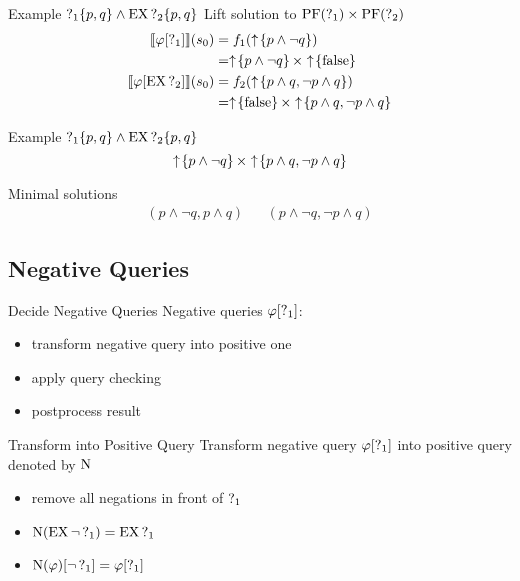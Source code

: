 
\begin{frame}{Example $\operatorname{?}_1\{p,q\} \land \operatorname{EX}\operatorname{?}_2\{p,q\}$}
  Lift solution to $\operatorname{PF}(\operatorname{?}_1) \times \operatorname{PF}(\operatorname{?}_2)$
  \begin{align*}
    \llbracket \varphi[\operatorname{?}_1] \rrbracket (s_0) 
      &= f_1(\uparrow \! \left\{ p \land \lnot q \right\}) \\
      &= \uparrow \! \left\{ p \land \lnot q \right\} \times \uparrow \! \left\{ \operatorname{false} \right\} \\
    \llbracket \varphi[\operatorname{EX}\operatorname{?}_2] \rrbracket (s_0) 
      &= f_2(\uparrow \! \left\{ p \land q, \lnot p \land q \right\}) \\
      &= \uparrow \! \left\{ \operatorname{false} \right\} \times \uparrow \! \left\{ p \land q, \lnot p \land q \right\}
  \end{align*}
\end{frame}

\begin{frame}{Example $\operatorname{?}_1\{p,q\} \land \operatorname{EX}\operatorname{?}_2\{p,q\}$}
  \[
    \uparrow \! \left\{ p \land \lnot q \right\} \times \uparrow \! \left\{ p \land q, \lnot p \land q \right\}
  \]

  Minimal solutions
  \begin{align*}
    (p \land \lnot q, p \land q) && (p \land \lnot q,\lnot p \land q)
  \end{align*}
\end{frame}



\subsection{Negative Queries}%

\begin{frame}{Decide Negative Queries}
  Negative queries $\varphi[\operatorname{?}_1]$:
  \begin{itemize}
    \item transform negative query into positive one
    \item apply query checking
    \item postprocess result
  \end{itemize}
\end{frame}

\begin{frame}{Transform into Positive Query}
  Transform negative query $\varphi[\operatorname{?}_1]$ into positive query denoted by $\operatorname{N}$
  \begin{itemize}
    \item remove all negations in front of $\operatorname{?}_{1}$
    \item $\operatorname{N}(\operatorname{EX} \lnot \operatorname{?}_1) = \operatorname{EX} \operatorname{?}_{1}$
    \item $\operatorname{N}(\varphi)[\lnot\operatorname{?}_1] = \varphi[\operatorname{?}_1]$
  \end{itemize}
\end{frame}

